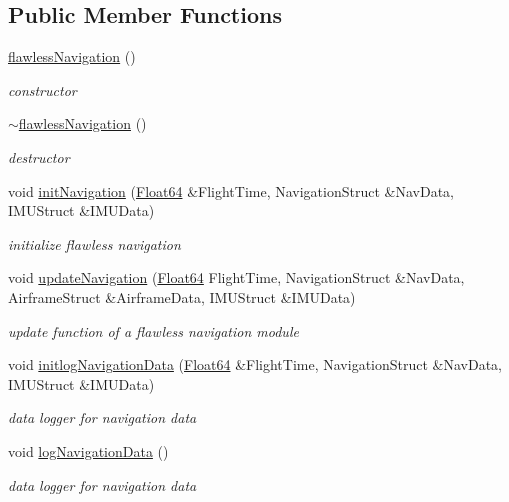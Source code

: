 \subsection*{Public Member Functions}
\begin{DoxyCompactItemize}
\item 
\hyperlink{classflawless_navigation_aaccd796774558ce387216cc539a2eae6}{flawless\+Navigation} ()
\begin{DoxyCompactList}\small\item\em constructor \end{DoxyCompactList}\item 
\hyperlink{classflawless_navigation_af9c6489e6dc05dc5f61646d768de02c0}{$\sim$flawless\+Navigation} ()
\begin{DoxyCompactList}\small\item\em destructor \end{DoxyCompactList}\item 
void \hyperlink{classflawless_navigation_a99e2e982cb7435cbb33533cce1941b39}{init\+Navigation} (\hyperlink{group___tools_ga3f1431cb9f76da10f59246d1d743dc2c}{Float64} \&Flight\+Time, Navigation\+Struct \&Nav\+Data, I\+M\+U\+Struct \&I\+M\+U\+Data)
\begin{DoxyCompactList}\small\item\em initialize flawless navigation \end{DoxyCompactList}\item 
void \hyperlink{classflawless_navigation_ac78ee91130f309c9c5db5bfccd6e8708}{update\+Navigation} (\hyperlink{group___tools_ga3f1431cb9f76da10f59246d1d743dc2c}{Float64} Flight\+Time, Navigation\+Struct \&Nav\+Data, Airframe\+Struct \&Airframe\+Data, I\+M\+U\+Struct \&I\+M\+U\+Data)
\begin{DoxyCompactList}\small\item\em update function of a flawless navigation module \end{DoxyCompactList}\item 
void \hyperlink{classflawless_navigation_a397a8e0d335203cf438a8004370329a5}{initlog\+Navigation\+Data} (\hyperlink{group___tools_ga3f1431cb9f76da10f59246d1d743dc2c}{Float64} \&Flight\+Time, Navigation\+Struct \&Nav\+Data, I\+M\+U\+Struct \&I\+M\+U\+Data)
\begin{DoxyCompactList}\small\item\em data logger for navigation data \end{DoxyCompactList}\item 
void \hyperlink{classflawless_navigation_a0c8ea43db88455be31576a4904f2711e}{log\+Navigation\+Data} ()
\begin{DoxyCompactList}\small\item\em data logger for navigation data \end{DoxyCompactList}\end{DoxyCompactItemize}


